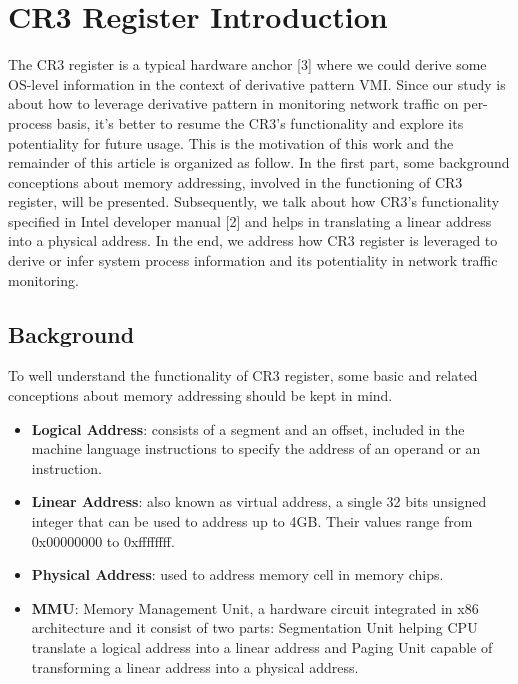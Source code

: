 
\chapter{CR3 Register Introduction} %

\label{AppendixA} %


The CR3 register is a typical hardware anchor [3] where we could derive some OS-level information in the context of derivative 
pattern VMI. Since our study is about how to leverage derivative pattern in monitoring network traffic on per-process basis, it’s 
better to resume the CR3’s functionality and explore its potentiality for future usage. This is the motivation of this work and the 
remainder of this article is organized as follow. In the first part, some background conceptions about memory addressing, involved 
in the functioning of CR3 register, will be presented. Subsequently, we talk about how CR3’s functionality specified in Intel 
developer manual [2] and helps in translating a linear address into a physical address. In the end, we address how CR3 register 
is leveraged to derive or infer system process information and its potentiality in network traffic monitoring. 

\section{Background \cite{BookLinuxKernel}}
To well understand the functionality of CR3 register, some basic and related conceptions about memory addressing should be kept in
mind.

\begin{itemize}
 \item\textbf{Logical Address}: consists of a segment and an offset, included in the machine language instructions to specify the address of an 
operand or an instruction.
 \item\textbf{Linear Address}: also known as virtual address, a single 32 bits unsigned integer that can be used to address up to 4GB. Their values
range from 0x00000000 to 0xffffffff.
 \item\textbf{Physical Address}: used to address memory cell in memory chips.
 \item\textbf{MMU}: Memory Management Unit, a hardware circuit integrated in x86 architecture and it consist of two parts:  
Segmentation Unit helping CPU translate a logical address into a linear address and Paging Unit capable of transforming a linear
address into a physical address.
\end{itemize}

